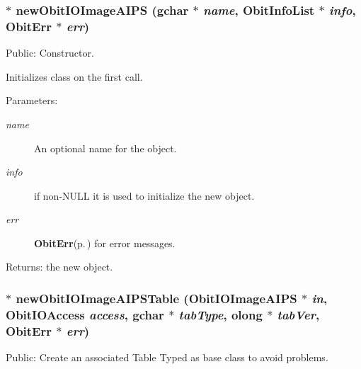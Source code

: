 \subsubsection{$\ast$ new\-Obit\-IOImage\-AIPS (gchar $\ast$ {\em name}, {\bf Obit\-Info\-List} $\ast$ {\em info}, {\bf Obit\-Err} $\ast$ {\em err})}\label{ObitIOImageAIPS_8h_a4}


Public: Constructor. 

Initializes class on the first call. \begin{Desc}
\item[Parameters:]
\begin{description}
\item[{\em name}]An optional name for the object. \item[{\em info}]if non-NULL it is used to initialize the new object. \item[{\em err}]{\bf Obit\-Err}{\rm (p.\,\pageref{structObitErr})} for error messages. \end{description}
\end{Desc}
\begin{Desc}
\item[Returns:]the new object. \end{Desc}
\subsubsection{$\ast$ new\-Obit\-IOImage\-AIPSTable ({\bf Obit\-IOImage\-AIPS} $\ast$ {\em in}, Obit\-IOAccess {\em access}, gchar $\ast$ {\em tab\-Type}, {\bf olong} $\ast$ {\em tab\-Ver}, {\bf Obit\-Err} $\ast$ {\em err})}\label{ObitIOImageAIPS_8h_a19}


Public: Create an associated Table Typed as base class to avoid problems. 

